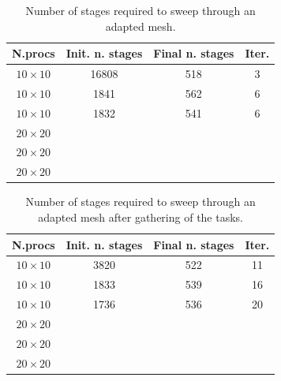 \documentclass[letterpaper]{article}
\renewcommand{\(}{\left(}
\renewcommand{\)}{\right)}
\renewcommand{\[}{\left[}
\renewcommand{\]}{\right]}
\begin{document}

\begin{table}[H]
  \begin{center}
    \begin{tabular}{|c|c|c|c|}
      \hline
      N.procs & Init. n. stages & Final n. stages & Iter. \\
      \hline
      $10 \times 10$ & 16808 & 518 & 3 \\
      $10 \times 10$ &  1841 & 562 & 6 \\
      $10 \times 10$ &  1832 & 541 & 6 \\
      $20 \times 20$ &       &     &   \\
      $20 \times 20$ &       &     &   \\
      $20 \times 20$ &       &     &   \\
      \hline
    \end{tabular}
    \caption{Number of stages required to sweep through an adapted mesh.}
    \label{band_1}
  \end{center}
\end{table}

\begin{table}[H]
  \begin{center}
    \begin{tabular}{|c|c|c|c|}
      \hline
      N.procs & Init. n. stages & Final n. stages & Iter. \\
      \hline
      $10 \times 10$ & 3820 & 522 & 11 \\
      $10 \times 10$ & 1833 & 539 & 16 \\
      $10 \times 10$ & 1736 & 536 & 20 \\
      $20 \times 20$ &       &     &   \\
      $20 \times 20$ &       &     &   \\
      $20 \times 20$ &       &     &   \\
      \hline
    \end{tabular}
    \caption{Number of stages required to sweep through an adapted mesh after
    gathering of the tasks.}
    \label{band_2}
  \end{center}
\end{table}
\end{document}
